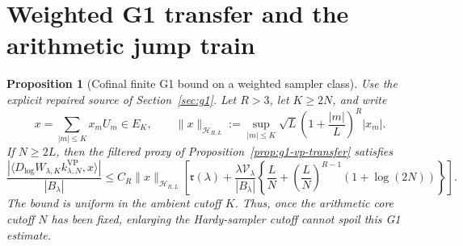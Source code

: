 \documentclass[11pt]{article}
\newtheorem{proposition}[theorem]{Proposition}
\theoremstyle{remark}
\begin{document}
\section{Weighted G1 transfer and the arithmetic jump train}\label{sec:weighted}
\begin{proposition}[Cofinal finite G1 bound on a weighted sampler class]\label{prop:g1-weighted-sampler}
Use the explicit repaired source of Section~\ref{sec:g1}.
Let $R>3$, let $K\ge2N$, and write
\[
 x=\sum_{|m|\le K}x_mU_m\in E_K,
 \qquad
 \|x\|_{\mathcal H_{R,L}}
 :=\sup_{|m|\le K}
 \sqrt L\left(1+\frac{|m|}{L}\right)^R|x_m|.
\]
If $N\ge2L$, then the filtered proxy of
Proposition~\ref{prop:g1-vp-transfer} satisfies
\begin{equation}\label{eq:g1-weighted-sampler}
 \boxed{
 \frac{|\langle D_{\log}W_{\lambda,K}
 k^{\mathrm{VP}}_{\lambda,N},x\rangle|}{|B_\lambda|}
 \le C_R\|x\|_{\mathcal H_{R,L}}
 \left[
 \mathfrak r(\lambda)
 +\frac{\lambda\mathcal V_\lambda}{|B_\lambda|}
 \left\{
 \frac{L}{N}
 +\left(\frac{L}{N}\right)^{R-1}(1+\log(2N))
 \right\}
 \right].}
\end{equation}
The bound is uniform in the ambient cutoff $K$.  Thus, once the arithmetic
core cutoff $N$ has been fixed, enlarging the Hardy-sampler cutoff cannot
spoil this G1 estimate.
\end{proposition}
\end{document}
